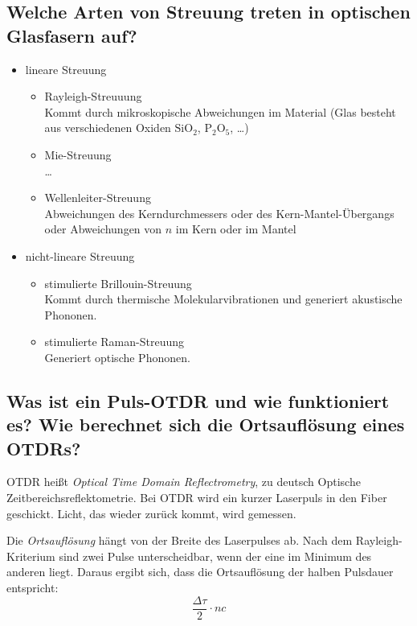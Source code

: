 \documentclass[a4paper]{scrartcl}
\begin{document}
\subsection*{Welche Arten von Streuung treten in optischen Glasfasern auf?}
\begin{itemize}
    \item lineare Streuung
    \begin{itemize}
        \item Rayleigh-Streuuung\\
              Kommt durch mikroskopische Abweichungen im Material
              (Glas besteht aus verschiedenen Oxiden
               $\text{Si}\text{O}_2$, $\text{P}_2\text{O}_5$, \ldots)
        \item Mie-Streuung\\
              \dots
        \item Wellenleiter-Streuung\\
              Abweichungen des Kerndurchmessers oder des Kern-Mantel-Übergangs
              oder Abweichungen von $n$ im Kern oder im Mantel
    \end{itemize}

    \item nicht-lineare Streuung
    \begin{itemize}
        \item stimulierte Brillouin-Streuung\\
              Kommt durch thermische Molekularvibrationen und generiert akustische Phononen.
        \item stimulierte Raman-Streuung\\
              Generiert optische Phononen.

    \end{itemize}
\end{itemize}


\subsection*{Was ist ein Puls-OTDR und wie funktioniert es?
Wie berechnet sich die Ortsauflösung eines OTDRs?}
OTDR heißt \emph{Optical Time Domain Reflectrometry},
zu deutsch Optische Zeitbereichsreflektometrie.
Bei OTDR wird ein kurzer Laserpuls in den Fiber geschickt.
Licht, das wieder zurück kommt, wird gemessen.

Die \emph{Ortsauflösung} hängt von der Breite des Laserpulses ab.
Nach dem Rayleigh-Kriterium sind zwei Pulse unterscheidbar,
wenn der eine im Minimum des anderen liegt.
Daraus ergibt sich, dass die Ortsauflösung der halben Pulsdauer entspricht:
\begin{equation*}
    \frac{\Delta \tau}{2} \cdot n c
\end{equation*}
\end{document}
